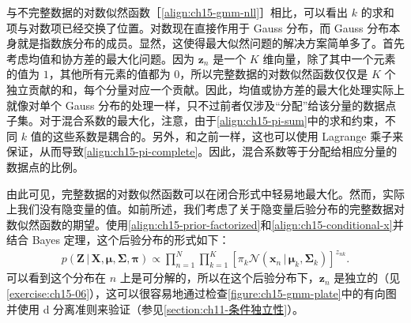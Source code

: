 \documentclass[../../main.tex]{subfiles}
\begin{document}
与不完整数据的对数似然函数［\eqref{align:ch15-gmm-nll}］相比，可以看出 $k$ 的求和项与对数项已经交换了位置。对数现在直接作用于 Gauss 分布，而 Gauss 分布本身就是指数族分布的成员。显然，这使得最大似然问题的解决方案简单多了。首先考虑均值和协方差的最大化问题。因为 $\bm{z}_n$ 是一个 $K$ 维向量，除了其中一个元素的值为 $1$，其他所有元素的值都为 $0$，所以完整数据的对数似然函数仅仅是 $K$ 个独立贡献的和，每个分量对应一个贡献。因此，均值或协方差的最大化处理实际上就像对单个 Gauss 分布的处理一样，只不过前者仅涉及“分配”给该分量的数据点子集。对于混合系数的最大化，注意，由于\eqref{align:ch15-pi-sum}中的求和约束，不同 $k$ 值的这些系数是耦合的。另外，和之前一样，这也可以使用 Lagrange 乘子来保证，从而导致\eqref{align:ch15-pi-complete}。因此，混合系数等于分配给相应分量的数据点的比例。

由此可见，完整数据的对数似然函数可以在闭合形式中轻易地最大化。然而，实际上我们没有隐变量的值。如前所述，我们考虑了关于隐变量后验分布的完整数据对数似然函数的期望。使用\eqref{align:ch15-prior-factorized}和\eqref{align:ch15-conditional-x}并结合 Bayes 定理，这个后验分布的形式如下：
\begin{align}
p(\bm{Z}\,|\,\bm{X},\bm{\mu},\bm{\Sigma},\bm{\pi})\propto\prod_{n=1}^{N}\prod_{k=1}^{K}\left[\pi_k\mathcal{N}(\bm{x}_n\,|\,\bm{\mu}_k,\bm{\Sigma}_k)\right]^{z_{nk}}.
\label{align:ch15-posterior}
\end{align}
可以看到这个分布在 $n$ 上是可分解的，所以在这个后验分布下，$\bm{z}_n$ 是独立的（见\cref{exercise:ch15-06}），这可以很容易地通过检查\cref{figure:ch15-gmm-plate}中的有向图并使用 d 分离准则来验证（参见\cref{section:ch11-条件独立性}）。
\end{document}
